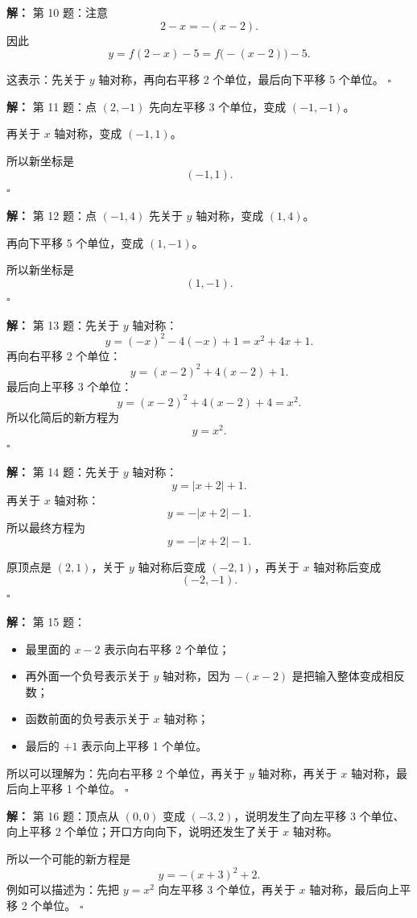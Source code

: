 \documentclass[11pt,a4paper,fontset=fandol]{ctexart}
\theoremstyle{formalexample}
\newenvironment{solution}{\par\noindent\textbf{解：}}{\hfill$\square$\par}
\begin{document}
\begin{solution}
第 10 题：注意
\[
2-x=-(x-2).
\]
因此
\[
y=f(2-x)-5=f\bigl(-(x-2)\bigr)-5.
\]

这表示：先关于 \(y\) 轴对称，再向右平移 2 个单位，最后向下平移 5 个单位。
\end{solution}

\begin{solution}
第 11 题：点 \((2,-1)\) 先向左平移 3 个单位，变成 \((-1,-1)\)。

再关于 \(x\) 轴对称，变成 \((-1,1)\)。

所以新坐标是
\[
\boxed{(-1,1)}.
\]
\end{solution}

\begin{solution}
第 12 题：点 \((-1,4)\) 先关于 \(y\) 轴对称，变成 \((1,4)\)。

再向下平移 5 个单位，变成 \((1,-1)\)。

所以新坐标是
\[
\boxed{(1,-1)}.
\]
\end{solution}

\begin{solution}
第 13 题：先关于 \(y\) 轴对称：
\[
y=(-x)^2-4(-x)+1=x^2+4x+1.
\]
再向右平移 2 个单位：
\[
y=(x-2)^2+4(x-2)+1.
\]
最后向上平移 3 个单位：
\[
y=(x-2)^2+4(x-2)+4=x^2.
\]
所以化简后的新方程为
\[
\boxed{y=x^2}.
\]
\end{solution}

\begin{solution}
第 14 题：先关于 \(y\) 轴对称：
\[
y=|x+2|+1.
\]
再关于 \(x\) 轴对称：
\[
y=-|x+2|-1.
\]
所以最终方程为
\[
\boxed{y=-|x+2|-1}.
\]

原顶点是 \((2,1)\)，关于 \(y\) 轴对称后变成 \((-2,1)\)，再关于 \(x\) 轴对称后变成
\[
\boxed{(-2,-1)}.
\]
\end{solution}

\begin{solution}
第 15 题：
\begin{itemize}
  \item 最里面的 \(x-2\) 表示向右平移 2 个单位；
  \item 再外面一个负号表示关于 \(y\) 轴对称，因为 \(-(x-2)\) 是把输入整体变成相反数；
  \item 函数前面的负号表示关于 \(x\) 轴对称；
  \item 最后的 \(+1\) 表示向上平移 1 个单位。
\end{itemize}
所以可以理解为：先向右平移 2 个单位，再关于 \(y\) 轴对称，再关于 \(x\) 轴对称，最后向上平移 1 个单位。
\end{solution}

\begin{solution}
第 16 题：顶点从 \((0,0)\) 变成 \((-3,2)\)，说明发生了向左平移 3 个单位、向上平移 2 个单位；开口方向向下，说明还发生了关于 \(x\) 轴对称。

所以一个可能的新方程是
\[
\boxed{y=-(x+3)^2+2}.
\]
例如可以描述为：先把 \(y=x^2\) 向左平移 3 个单位，再关于 \(x\) 轴对称，最后向上平移 2 个单位。
\end{solution}
\end{document}
